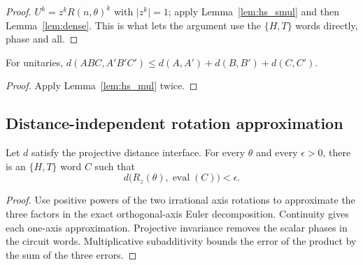 \begin{proof}
  \leanok
  $U^k = z^k R(n,\theta)^k$ with $\lvert z^k\rvert = 1$; apply
  Lemma~\ref{lem:hs_smul} and then Lemma~\ref{lem:dense}.  This is what lets
  the argument use the $\{H,T\}$ words directly, phase and all.
\end{proof}

\begin{lemma}
  \label{lem:hs_triple}
  \leanok
  For unitaries, $d(ABC, A'B'C') \le d(A,A') + d(B,B') + d(C,C')$.
\end{lemma}

\begin{proof}
  \leanok
  Apply Lemma~\ref{lem:hs_mul} twice.
\end{proof}

\subsection{Distance-independent rotation approximation}

\begin{theorem}[$R_z$ approximation by $\{H,T\}$]
  \label{thm:lemma12_projective}
  \leanok
  Let $d$ satisfy the projective distance interface.  For every $\theta$ and
  every $\epsilon>0$, there is an $\{H,T\}$ word $C$ such that
  \[
    d\bigl(R_z(\theta),\operatorname{eval}(C)\bigr)<\epsilon.
  \]
\end{theorem}

\begin{proof}
  \leanok
  Use positive powers of the two irrational axis rotations to approximate the
  three factors in the exact orthogonal-axis Euler decomposition.  Continuity
  gives each one-axis approximation.  Projective invariance removes the
  scalar phases in the circuit words.  Multiplicative subadditivity bounds the
  error of the product by the sum of the three errors.
\end{proof}
